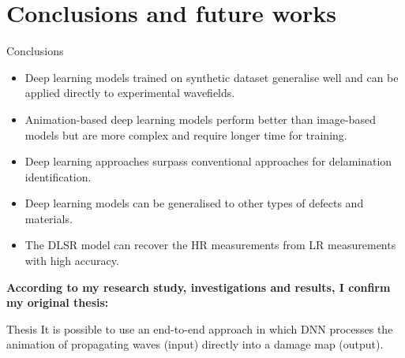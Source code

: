 \documentclass[10pt,aspectratio=169,dvipsnames]{beamer} %
\begin{document}
	\section{Conclusions and future works}
	\begin{frame}{Conclusions}		
		\begin{footnotesize}
			\begin{justify}
				\addtolength{\leftmargini}{\labelsep}
				\begin{itemize}
					\item{Deep learning models trained on synthetic dataset generalise well and can be applied directly to experimental wavefields.}				
					\item{Animation-based deep learning models perform better than image-based models but are more complex and require longer time for training.}
					\item{Deep learning approaches surpass conventional approaches for delamination identification.}
					\item{Deep learning models can be generalised to other types of defects and materials.}
					\item{The DLSR model can recover the HR measurements from LR measurements with high accuracy.}
				\end{itemize}
			\end{justify}				
		\begin{tcolorbox}
			\begin{justify}
				\textbf{According to my research study, investigations and results, I confirm my original thesis:}
				\begin{alertblock}{Thesis}
					It is possible to use an end-to-end approach in which DNN 
					processes the animation of propagating waves (input) directly into a damage map (output).
				\end{alertblock}
			\end{justify}			
		\end{tcolorbox}				
		\end{footnotesize}			
	\end{frame}		
\end{document}
